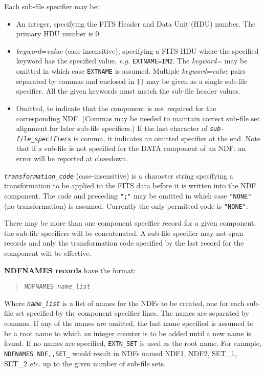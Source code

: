 \documentclass[twoside,11pt]{article}
\newcommand{\ssthitemlist}[1]{
  \latexonly{
  \mbox{} \\
  \vspace{-3.5ex}
  }
  \begin{itemize}
     #1
  \end{itemize}
}
\newcommand{\sstitem}{\item}
\newcommand{\sstitem}{\item}
\begin{document}
{{{{              Each sub-file specifier may be:
              \ssthitemlist{
              \sstitem
              An integer, specifying the FITS Header and Data Unit (HDU)
                 number. The primary HDU number is 0.
              \sstitem
              \textit{keyword}=\textit{value} (case-insensitive), specifying 
                 a FITS HDU
                 where the specified keyword has the specified value,
                 \textit{e.g.} \texttt{EXTNAME=IM2}.
                 The \textit{keyword=} may be omitted in which
                 case \texttt{EXTNAME} is assumed.
                 Multiple \textit{keyword}=\textit{value} pairs separated by
                 commas and enclosed
                 in \texttt{[]} may be given as a single sub-file specifier.
                 All the given keywords must match the sub-file header values.
              \sstitem
              Omitted, to indicate that the component is not required
                 for the corresponding NDF. (Commas may be needed to maintain
                 correct sub-file set alignment for later sub-file
                 specifiers.) If the last character of 
                 \texttt{\textit{sub-file\_specifiers}} is comma, it
                 indicates an omitted specifier at the end.
                 Note that if a sub-file is not specified for the DATA
                 component of an NDF, an error will be reported at closedown.
              }
           \sstitem
           \texttt{\textit{transformation\_code}} (case-insensitive) is a 
              character string specifying a  transformation to be applied to
              the FITS data before it is written into the NDF component.
              The code and
              preceding \texttt{";"} may be omitted in which case \texttt{"NONE"} (no
              transformation) is assumed.  Currently the only permitted code
              is \texttt{"NONE"}.
           }
          There may be more than one component specifier record for a given
          component, the sub-file specifiers will be concatenated. A
          sub-file specifier may not span records and only the transformation
          code specified by the last record for the component will be
          effective.
          \medskip

        \textbf{NDFNAMES records} have the format:
          \begin{quote}
          \texttt{NDFNAMES \textit{name\_list}}
          \end{quote}
           Where \texttt{\textit{name\_list}} is a list of names for the NDFs
           to be created, one
           for each sub-file set specified by the component specifier lines.
           The names are separated by commas. If any of the names are omitted,
           the last name specified is assumed to be a root name to which an
           integer counter is to be added until a new name is found.  If no
           names are specified, \texttt{EXTN\_SET} is used as the root name.
           For example,  \texttt{NDFNAMES NDF,,SET\_}
           would result in NDFs named NDF1, NDF2, SET\_1, SET\_2 \textit{etc.}
           up to the given number of sub-file sets.

}}}
\end{document}
